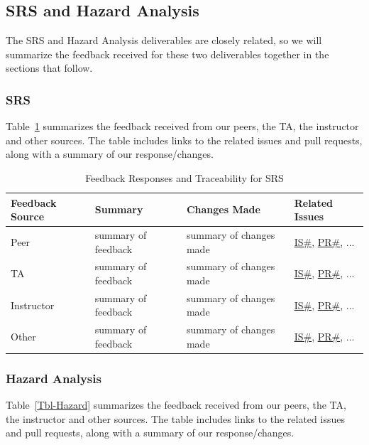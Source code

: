 \documentclass{article}
\begin{document}
\subsection{SRS and Hazard Analysis}

The SRS and Hazard Analysis deliverables are closely related, so we will
summarize the feedback received for these two deliverables together in the
sections that follow.

\subsubsection{SRS}

Table~\ref{Tbl-SRS} summarizes the feedback received from our peers, the TA, the
instructor and other sources.  The table includes links to the related issues
and pull requests, along with a summary of our response/changes.

\begin{longtable}{|p{2cm}|p{4cm}|p{5cm}|p{4cm}|}
\caption{Feedback Responses and Traceability for SRS}
\label{Tbl-SRS}\\

\hline
\textbf{Feedback Source} & \textbf{Summary} & \textbf{Changes Made} & \textbf{Related Issues} \\ 
\hline
\endhead

Peer & summary of feedback & summary of changes made & \href{link}{IS\#}, \href{link}{PR\#}, ... \\
\hline
TA & summary of feedback & summary of changes made & \href{link}{IS\#}, \href{link}{PR\#}, ... \\
\hline
Instructor & summary of feedback & summary of changes made & \href{link}{IS\#}, \href{link}{PR\#}, ... \\
\hline
Other & summary of feedback & summary of changes made & \href{link}{IS\#}, \href{link}{PR\#}, ... \\
\hline
\end{longtable}

\subsubsection{Hazard Analysis}

Table~\ref{Tbl-Hazard} summarizes the feedback received from our peers, the TA,
the instructor and other sources.  The table includes links to the related
issues and pull requests, along with a summary of our response/changes.
\end{document}
